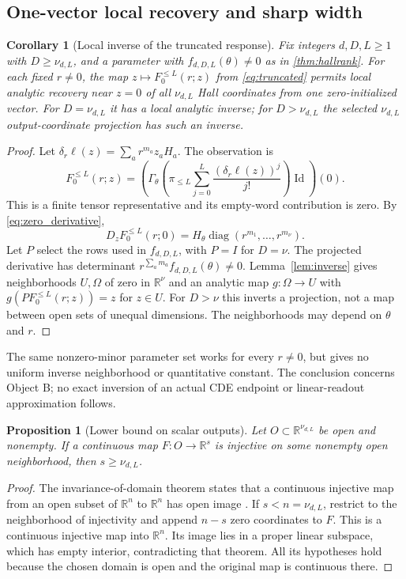 \documentclass[11pt,a4paper]{article}
\numberwithin{equation}{section}
\newtheorem{proposition}[theorem]{Proposition}
\newtheorem{corollary}[theorem]{Corollary}
\theoremstyle{definition}
\theoremstyle{remark}
\DeclareMathOperator{\Id}{Id}
\DeclareMathOperator{\diag}{diag}
\newcommand{\R}{\mathbb R}
\begin{document}
\subsection{One-vector local recovery and sharp width}
\begin{corollary}[Local inverse of the truncated response]\label{cor:hallinverse}
Fix integers $d,D,L\geq1$ with $D\geq\nu_{d,L}$, and a parameter with
$f_{d,D,L}(\theta)\ne0$ as in \cref{thm:hallrank}. For each fixed
$r\ne0$, the map $z\mapsto F_0^{\leq L}(r;z)$ from
\eqref{eq:truncated} permits local analytic recovery near $z=0$ of all
$\nu_{d,L}$ Hall coordinates from one zero-initialized vector.
For $D=\nu_{d,L}$ it has a local analytic inverse; for $D>\nu_{d,L}$
the selected $\nu_{d,L}$ output-coordinate projection has such an inverse.
\end{corollary}
\begin{proof}
Let $\delta_r\ell(z)=\sum_a r^{m_a}z_aH_a$. The observation is
\[
 F_0^{\leq L}(r;z)
 =\left(\Gamma_\theta\left(
   \pi_{\leq L}\sum_{j=0}^L
          \frac{(\delta_r\ell(z))^j}{j!}\right)\Id\right)(0).
\]
This is a finite tensor representative and its empty-word contribution
is zero. By \eqref{eq:zero_derivative},
\begin{equation}\label{eq:halljacobian}
 D_zF_0^{\leq L}(r;0)
 =H_\theta\diag(r^{m_1},\ldots,r^{m_\nu}).
\end{equation}
Let $P$ select the rows used in $f_{d,D,L}$, with $P=I$ for $D=\nu$.
The projected derivative has determinant
$r^{\sum_a m_a}f_{d,D,L}(\theta)\ne0$.
Lemma~\ref{lem:inverse} gives neighborhoods $U,\Omega$ of zero in
$\R^\nu$ and an analytic map $g:\Omega\to U$ with
$g(PF_0^{\leq L}(r;z))=z$ for $z\in U$.
For $D>\nu$ this inverts a projection, not a map between open sets of
unequal dimensions. The neighborhoods may depend on $\theta$ and $r$.
\end{proof}
The same nonzero-minor parameter set works for every $r\ne0$, but gives
no uniform inverse neighborhood or quantitative constant. The conclusion
concerns Object B; no exact inversion of an actual CDE endpoint or
linear-readout approximation follows.

\begin{proposition}[Lower bound on scalar outputs]\label{prop:dimension}
Let $O\subset\R^{\nu_{d,L}}$ be open and nonempty. If a continuous map
$F:O\to\R^s$ is injective on some nonempty open neighborhood, then
$s\geq\nu_{d,L}$.
\end{proposition}
\begin{proof}
The invariance-of-domain theorem states that a continuous injective map
from an open subset of $\R^n$ to $\R^n$ has open image
\cite[Theorem 2B.3]{Hatcher}. If $s<n=\nu_{d,L}$, restrict to the
neighborhood of injectivity and append $n-s$ zero coordinates to $F$.
This is a continuous injective map into $\R^n$. Its image lies in a
proper linear subspace, which has empty interior, contradicting that
theorem. All its hypotheses hold because the chosen domain is open and
the original map is continuous there.
\end{proof}
\end{document}
